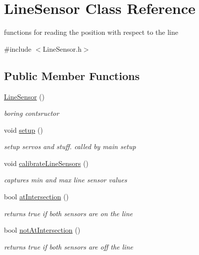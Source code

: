 \hypertarget{classLineSensor}{\section{Line\-Sensor Class Reference}
\label{classLineSensor}
}


functions for reading the position with respect to the line  




{\ttfamily \#include $<$Line\-Sensor.\-h$>$}

\subsection*{Public Member Functions}
\begin{DoxyCompactItemize}
\item 
\hyperlink{classLineSensor_af1f1d8c89ae0992f53b44c845cf7b9e1}{Line\-Sensor} ()
\begin{DoxyCompactList}\small\item\em boring contsructor \end{DoxyCompactList}\item 
void \hyperlink{classLineSensor_a555f6f7222ea1e76ed810edbde44c39c}{setup} ()
\begin{DoxyCompactList}\small\item\em setup servos and stuff. called by main setup \end{DoxyCompactList}\item 
void \hyperlink{classLineSensor_ab134af3ba9f3368a91e3f0e095c86b53}{calibrate\-Line\-Sensors} ()
\begin{DoxyCompactList}\small\item\em captures min and max line sensor values \end{DoxyCompactList}\item 
bool \hyperlink{classLineSensor_a6769cf781edb7ac4a43086cd62be01e2}{at\-Intersection} ()
\begin{DoxyCompactList}\small\item\em returns true if both sensors are on the line \end{DoxyCompactList}\item 
bool \hyperlink{classLineSensor_a78dc9b13b899c5ac0a18a4aef1eee774}{not\-At\-Intersection} ()
\begin{DoxyCompactList}\small\item\em returns true if both sensors are off the line \end{DoxyCompactList}\item 

\end{DoxyCompactItemize}
